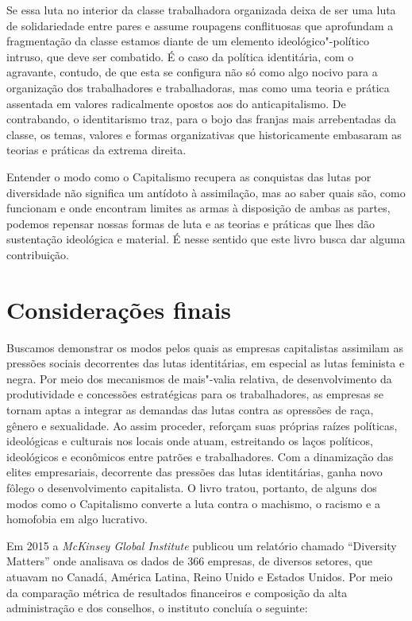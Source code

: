 Se essa luta no interior da classe trabalhadora organizada deixa de ser
uma luta de solidariedade entre pares e assume roupagens conflituosas
que aprofundam a fragmentação da classe estamos diante de um elemento
ideológico"-político intruso, que deve ser combatido. É o caso da
política identitária, com o agravante, contudo, de que esta se configura
não só como algo nocivo para a organização dos trabalhadores e
trabalhadoras, mas como uma teoria e prática assentada em valores
radicalmente opostos aos do anticapitalismo. De contrabando, o
identitarismo traz, para o bojo das franjas mais arrebentadas da classe,
os temas, valores e formas organizativas que historicamente embasaram as
teorias e práticas da extrema direita.

Entender o modo como o Capitalismo recupera as conquistas das lutas por
diversidade não significa um antídoto à assimilação, mas ao saber quais
são, como funcionam e onde encontram limites as armas à disposição de
ambas as partes, podemos repensar nossas formas de luta e as teorias e
práticas que lhes dão sustentação ideológica e material. É nesse sentido
que este livro busca dar alguma contribuição.

\chapter{Considerações finais}

Buscamos demonstrar os modos pelos quais as empresas capitalistas
assimilam as pressões sociais decorrentes das lutas identitárias, em
especial as lutas feminista e negra. Por meio dos mecanismos de
mais"-valia relativa, de desenvolvimento da produtividade e concessões
estratégicas para os trabalhadores, as empresas se tornam aptas a
integrar as demandas das lutas contra as opressões de raça, gênero e
sexualidade. Ao assim proceder, reforçam suas próprias raízes políticas,
ideológicas e culturais nos locais onde atuam, estreitando os laços
políticos, ideológicos e econômicos entre patrões e trabalhadores. Com a
dinamização das elites empresariais, decorrente das pressões das lutas
identitárias, ganha novo fôlego o desenvolvimento capitalista. O livro
tratou, portanto, de alguns dos modos como o Capitalismo converte a luta
contra o machismo, o racismo e a homofobia em algo lucrativo.

Em 2015 a \emph{McKinsey Global Institute} publicou um relatório chamado
``Diversity Matters'' onde analisava os dados de 366 empresas, de
diversos setores, que atuavam no Canadá, América Latina, Reino Unido e
Estados Unidos. Por meio da comparação métrica de resultados financeiros
e composição da alta administração e dos conselhos, o instituto concluía
o seguinte:

